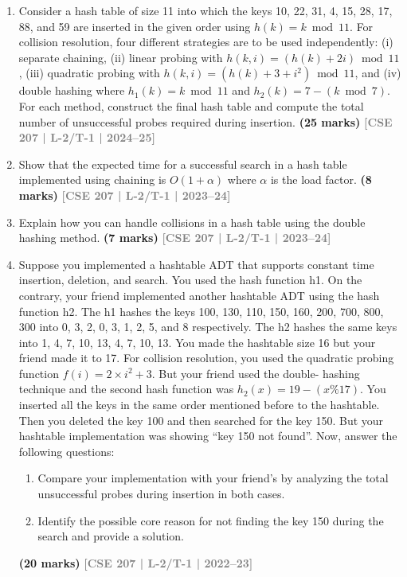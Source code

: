 \documentclass[12pt,a3paper]{article}
\newcommand{\yr}[1]{\hfill\textcolor{gray}{\small\textbf{[#1]}}}
\newcommand{\mk}[1]{\textcolor{orange!70!black}{\small\textbf{(#1 marks)}}}
\begin{document}
\begin{enumerate}

\item Consider a hash table of size 11 into which the keys 10, 22, 31, 4, 15, 28, 17, 88, and 59 are inserted in the given order using $h(k) = k \bmod 11$. For collision resolution, four different strategies are to be used independently: (i) separate chaining, (ii) linear probing with $h(k,i) = (h(k) + 2i) \bmod 11$, (iii) quadratic probing with $h(k,i) = (h(k) + 3 + i^2) \bmod 11$, and (iv) double hashing where $h_1(k) = k \bmod 11$ and $h_2(k) = 7 - (k \bmod 7)$. For each method, construct the final hash table and compute the total number of unsuccessful probes required during insertion.
\mk{25} \yr{CSE 207 | L-2/T-1 | 2024--25}

\item Show that the expected time for a successful search in a hash table implemented using chaining is $O(1 + \alpha)$ where $\alpha$ is the load factor.
\mk{8} \yr{CSE 207 | L-2/T-1 | 2023--24}

\item Explain how you can handle collisions in a hash table using the double hashing method.
\mk{7} \yr{CSE 207 | L-2/T-1 | 2023--24}

\item Suppose you implemented a hashtable ADT that supports constant time insertion, 
    deletion, and search. You used the hash function h1. On the contrary, your friend 
    implemented another hashtable ADT using the hash function h2. The h1 hashes the 
    keys 100, 130, 110, 150, 160, 200, 700, 800, 300 into 0, 3, 2, 0, 3, 1, 2, 5, and 8 
    respectively. The h2 hashes the same keys into 1, 4, 7, 10, 13, 4, 7, 10, 13. You made 
    the hashtable size 16 but your friend made it to 17. For collision resolution, you used 
    the quadratic probing function $f(i) = 2 \times i^2 + 3$. But your friend used the double-
    hashing technique and the second hash function was $h_2(x) = 19 - (x\%17)$. You 
    inserted all the keys in the same order mentioned before to the hashtable. Then you 
    deleted the key 100 and then searched for the key 150. But your hashtable 
    implementation was showing ``key 150 not found''. Now, answer the following 
    questions:
\begin{enumerate}
  \item Compare your implementation with your friend's by analyzing the total unsuccessful probes during insertion in both cases.
  \item Identify the possible core reason for not finding the key 150 during the search and provide a solution.
\end{enumerate}
\mk{20} \yr{CSE 207 | L-2/T-1 | 2022--23}



\end{enumerate}
\end{document}
